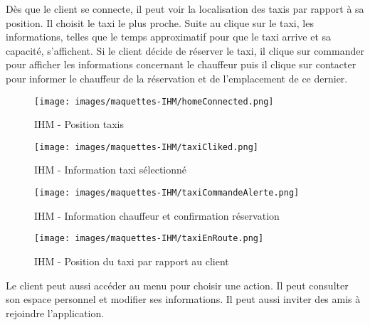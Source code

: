 {\vspace*{2cm}
Dès que le client se connecte, il peut voir la localisation des taxis par rapport à sa position. Il choisit le taxi le plus proche. Suite au clique sur le taxi, les informations, telles que le temps approximatif pour que le taxi arrive et sa capacité, s’affichent. Si le client décide de réserver le taxi, il clique sur commander pour afficher les informations concernant le chauffeur puis il clique sur contacter pour informer le chauffeur de la réservation et de l’emplacement de ce dernier.



\begin{minipage}[c]{.46\linewidth}
\begin{figure}[H]
\centering
\texttt{[image: images/maquettes-IHM/homeConnected.png]}
\caption{IHM - Position taxis}
\end{figure}

 \end{minipage}\hfill
\begin{minipage}[c]{.46\linewidth}
\begin{figure}[H]
\centering
\texttt{[image: images/maquettes-IHM/taxiCliked.png]}
\caption{IHM - Information taxi sélectionné}
\end{figure}

\end{minipage}



\vspace*{1cm}
\begin{minipage}[c]{.46\linewidth}
\begin{figure}[H]
\centering
\texttt{[image: images/maquettes-IHM/taxiCommandeAlerte.png]}
\caption{IHM - Information chauffeur et confirmation réservation}
\end{figure}

 \end{minipage}\hfill
\begin{minipage}[c]{.46\linewidth}
\begin{figure}[H]
\centering
\texttt{[image: images/maquettes-IHM/taxiEnRoute.png]}
\caption{IHM - Position du taxi par rapport au client}
\end{figure}

\end{minipage}

\newpage
Le client peut aussi accéder au menu pour choisir une action. Il peut consulter son espace personnel et modifier ses informations. Il peut aussi inviter des amis à rejoindre l’application.



}
